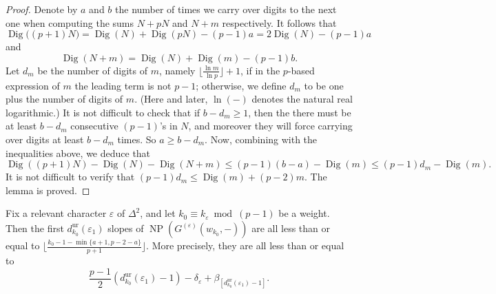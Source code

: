 \begin{proof}
    Denote by $a$ and $b$ the number of times we carry over digits to the next one when computing the sums $N+pN$ and $N+m$ respectively. It follows that
    \[
    {\operatorname{Dig}}\big((p+1)N \big)={\operatorname{Dig}}(N)+{\operatorname{Dig}}(pN)-(p-1)a=2{\operatorname{Dig}}(N)-(p-1)a
    \]
    and
    \[
    {\operatorname{Dig}}(N+m)={\operatorname{Dig}}(N)+{\operatorname{Dig}}(m)-(p-1)b.
    \]
    Let $d_m$ be the number of digits of $m$, namely $\lfloor\frac{\ln m}{\ln p}\rfloor+1$, if in the $p$-based expression of $m$ the leading term is not $p-1$; otherwise, we define $d_m$ to be one plus the number of digits of $m$. (Here and later, $\ln(-)$ denotes the natural real logarithmic.) It is not difficult to check that if $b-d_m \geq 1$, then the there must be at least $b-d_m$ consecutive $(p-1)$'s in $N$, and moreover they will force carrying over digits at least $b-d_m$ times. So $a \geq b-d_m$.
    Now, combining with the inequalities above, we deduce that
    $$
    {\operatorname{Dig}}((p+1)N) - {\operatorname{Dig}}(N) -{\operatorname{Dig}}(N+m) \leq (p-1)(b-a)-{\operatorname{Dig}}(m) \leq  (p-1)d_m -{\operatorname{Dig}}(m).
    $$
    It is not difficult to verify that $(p-1)d_m \leq {\operatorname{Dig}}(m) + (p-2)m$. The lemma is proved.
\end{proof}

\begin{proposition}
    \label{P:gouvea_k-1_p_plus_1_conjecture}
    Fix a relevant character $\varepsilon$ of $\Delta^2$, and let $k_0 \equiv k_\varepsilon \bmod{(p-1)}$ be a weight. Then the first $d_{k_0}^{\mathrm{ur}}(\varepsilon_1)$ slopes of ${\operatorname{NP}}(G^{(\varepsilon)}(w_{k_0}, -))$ are all less than or equal to $\big\lfloor\frac{k_0-1-\min\{a+1,p-2-a\}}{p+1}\big\rfloor$. More precisely, they are all less than or equal to
    \begin{equation}
    \label{E:gouvea_maximal_slope}
    \frac{p-1}2(d_{k_0}^{\mathrm{ur}}(\varepsilon_1)-1)-\delta_\varepsilon + \beta_{[d_{k_0}^{\mathrm{ur}}(\varepsilon_1)-1]}.
    \end{equation}
\end{proposition}

